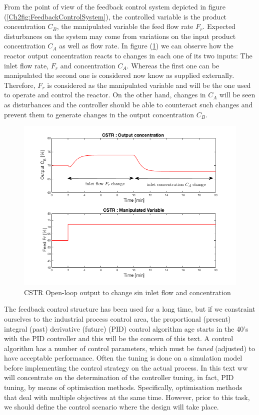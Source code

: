 From the point of view of the feedback control system depicted in figure (\ref{Ch2fig:FeedbackControlSystem}), the controlled variable is the product concentration $C_B$, the manipulated variable  the feed flow rate $F_r$. Expected disturbances on the system  may come from variations on the input product concentration $C_A$ as well as flow rate. In figure (\ref{Ch2fig:CSTRFigureOpenLoop}) we can observe how the reactor output concentration reacts to changes in each one of its two inputs: The inlet flow rate, $F_r$ and concentration $C_A$. Whereas the first one can be manipulated the second one is considered now know as supplied externally. Therefore, $F_r$ is considered as the manipulated variable and will be the one used to operate and control the reactor. On the other hand, changes in $C_A$ will be seen as disturbances and the controller should be able to counteract such changes and prevent them to generate changes in the output concentration $C_B$. 

\begin{figure}[htb]
\centering
\includegraphics[width=0.9\linewidth]{../figuras/Ch2FigureOpenLoop}
\caption{CSTR Open-loop output to change sin inlet flow and concentration} 
\label{Ch2fig:CSTRFigureOpenLoop}
\end{figure}


The feedback control structure has been used for a long time, but if we constraint ourselves to the industrial process control area, the proportional (present) integral (past) derivative (future) (PID) control algorithm age starts in the 40's  with the PID controller and this will be the concern of this text.  A control algorithm has a number of control parameters, which must be \emph{tuned} (adjusted) to have acceptable performance. Often the tuning is done on a simulation model before implementing the control strategy on the actual process. In this text ww will concentrate on the determination of the controller tuning, in fact, PID tuning, by means of optimisation methods. Specifically, optimisation methods that deal with multiple objectives at the same time. However, prior to this task, we should define the control scenario where the design will take place.\\


